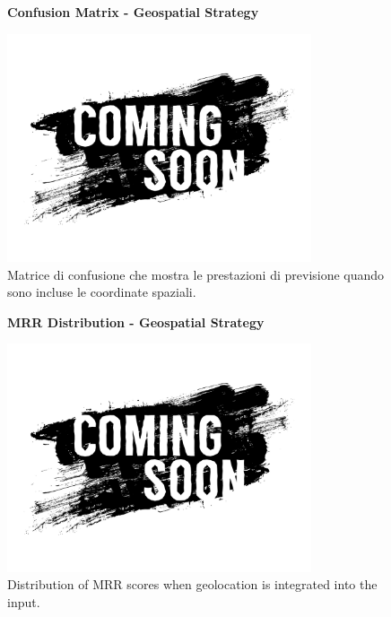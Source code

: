 \begin{enumerate}
\begin{figure}[H]
\centering
\textbf{Confusion Matrix - Geospatial Strategy}\par
\vspace{0.5em}
\includegraphics[width=0.8\textwidth]{../../img/SPACE-GEO_n-1_come_current_POI/tmp.jpg}
\caption{Matrice di confusione che mostra le prestazioni di previsione quando sono incluse le coordinate spaziali.}
\label{fig:geospatial_confusion}
\end{figure}

\begin{figure}[H]
\centering
\textbf{MRR Distribution - Geospatial Strategy}\par
\vspace{0.5em}
\includegraphics[width=0.8\textwidth]{../../img/SPACE-GEO_n-1_come_current_POI/tmp.jpg}
\caption{Distribution of MRR scores when geolocation is integrated into the input.}
\label{fig:geospatial_mrr}
\end{figure}


\end{enumerate}
